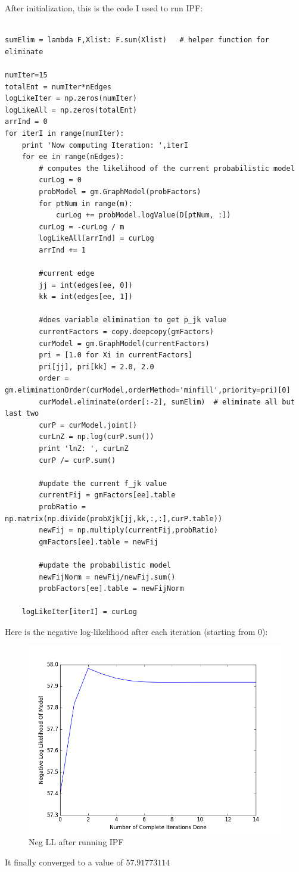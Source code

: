 \documentclass[twoside,11pt]{article}
\theoremstyle{definition}
\begin{document}
\newpage

After initialization, this is the code I used to run IPF:

\begin{lstlisting}

sumElim = lambda F,Xlist: F.sum(Xlist)   # helper function for eliminate

numIter=15
totalEnt = numIter*nEdges
logLikeIter = np.zeros(numIter)
logLikeAll = np.zeros(totalEnt)
arrInd = 0
for iterI in range(numIter):
    print 'Now computing Iteration: ',iterI
    for ee in range(nEdges):
        # computes the likelihood of the current probabilistic model
        curLog = 0
        probModel = gm.GraphModel(probFactors)
        for ptNum in range(m):
            curLog += probModel.logValue(D[ptNum, :])
        curLog = -curLog / m
        logLikeAll[arrInd] = curLog
        arrInd += 1

        #current edge
        jj = int(edges[ee, 0])
        kk = int(edges[ee, 1])

        #does variable elimination to get p_jk value
        currentFactors = copy.deepcopy(gmFactors)
        curModel = gm.GraphModel(currentFactors)
        pri = [1.0 for Xi in currentFactors]
        pri[jj], pri[kk] = 2.0, 2.0
        order = gm.eliminationOrder(curModel,orderMethod='minfill',priority=pri)[0]
        curModel.eliminate(order[:-2], sumElim)  # eliminate all but last two
        curP = curModel.joint()
        curLnZ = np.log(curP.sum())
        print 'lnZ: ', curLnZ
        curP /= curP.sum()

        #update the current f_jk value
        currentFij = gmFactors[ee].table
        probRatio = np.matrix(np.divide(probXjk[jj,kk,:,:],curP.table))
        newFij = np.multiply(currentFij,probRatio)
        gmFactors[ee].table = newFij

        #update the probabilistic model
        newFijNorm = newFij/newFij.sum()
        probFactors[ee].table = newFijNorm

    logLikeIter[iterI] = curLog

\end{lstlisting}
\newpage

Here is the negative log-likelihood after each iteration (starting from 0):

\begin{figure}[h]
\centering
\includegraphics[width=6in]{prob2cPlot2.png}
\caption{Neg LL after running IPF}
\end{figure}

It finally converged to a value of $57.91773114$
\end{document}
